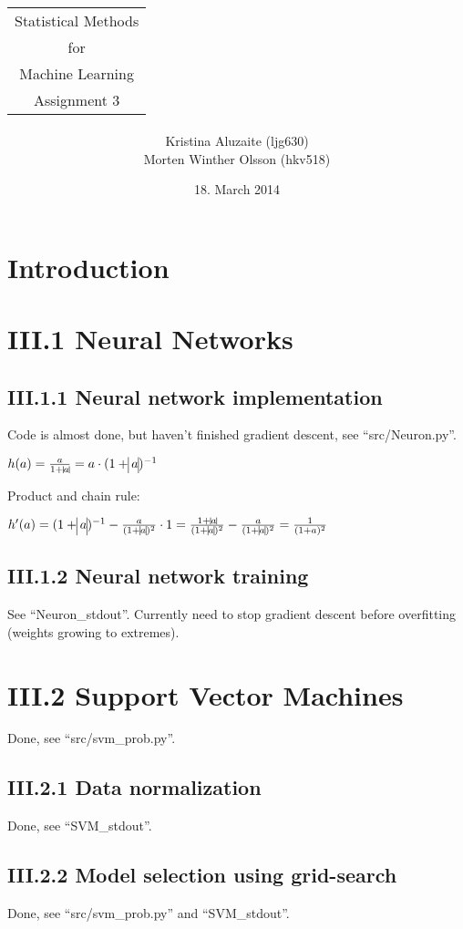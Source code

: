 \documentclass{article}
\title{\begin{tabular}{c}
Statistical Methods\\
for\\
Machine Learning\\
Assignment 3\\
\end{tabular}}
\date{18. March 2014}
\author{\begin{tabular}{c}
Kristina Aluzaite (ljg630)\\
Morten Winther Olsson (hkv518)\\
\end{tabular}}
\theoremstyle{dotless}
\newcounter{min}
\newcommand{\Section}[1]{\section{#1}
\setcounter{min}{1}}
\begin{document}

\maketitle
\thispagestyle{fancy}

\newpage{}



\Section{Introduction}

\Section{III.1 Neural Networks}

\subsection{III.1.1 Neural network implementation}

Code is almost done, but haven't finished gradient descent, see ``src/Neuron.py''.

$h(a)=\frac{a}{1+\vline a\vline}=a\cdot(1+\vline a\vline)^{-1}$

Product and chain rule:

$h'(a)=(1+\vline a\vline)^{-1}-\frac{a}{(1+\vline a\vline)^2}\cdot 1=\frac{1+\vline a\vline}{(1+\vline a\vline)^2}-\frac{a}{(1+\vline a\vline)^2}=\frac{1}{(1+a)^2}$

\subsection{III.1.2 Neural network training}

See ``Neuron\_stdout''. Currently need to stop gradient descent before overfitting (weights growing to extremes).

\Section{III.2 Support Vector Machines}

Done, see ``src/svm\_prob.py''.

\subsection{III.2.1 Data normalization}

Done, see ``SVM\_stdout''.

\subsection{III.2.2 Model selection using grid-search}

Done, see ``src/svm\_prob.py'' and ``SVM\_stdout''.
\end{document}
